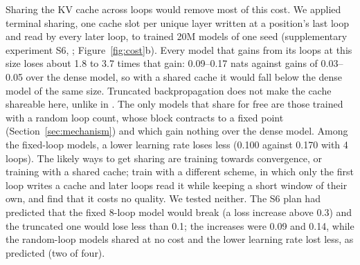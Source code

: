 Sharing the KV cache across loops would remove most of this cost. We applied terminal sharing, one cache slot per
unique layer written at a position's last loop and read by every later loop, to trained 20M models of one seed
(supplementary experiment S6, ; Figure~\ref{fig:cost}b). Every model that gains from its loops at this size loses about 1.8
to 3.7 times that gain: 0.09--0.17 nats against gains of 0.03--0.05 over the dense model, so with a shared cache it would fall
below the dense model of the same size. Truncated backpropagation does not make the cache shareable here, unlike in
\citet{huang2026towards}. The only models that share for free are those trained with a random loop count, whose block
contracts to a fixed point (Section~\ref{sec:mechanism}) and which gain nothing over the dense model. Among the fixed-loop
models, a lower learning rate loses less (0.100 against 0.170 with 4 loops). The likely ways to get sharing are
training towards convergence, or training with a shared cache; \citet{monea2026shared} train with a different scheme,
in which only the first loop writes a cache and later loops read it while keeping a short window of their own, and
find that it costs no quality. We tested neither. The S6 plan had predicted that the fixed 8-loop model would break (a
loss increase above 0.3) and the truncated one would lose less than 0.1; the increases were 0.09 and 0.14, while the
random-loop models shared at no cost and the lower learning rate lost less, as predicted (two of four).
